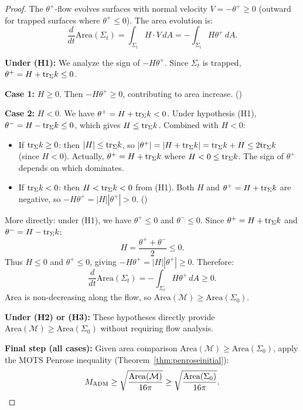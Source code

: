 \begin{proof}
The $\theta^+$-flow evolves surfaces with normal velocity $V = -\theta^+ \geq 0$ (outward for trapped surfaces where $\theta^+ \leq 0$). The area evolution is:
\begin{equation}
\frac{d}{dt}\mathrm{Area}(\Sigma_t) = \int_{\Sigma_t} H \cdot V \, dA = -\int_{\Sigma_t} H \theta^+ \, dA.
\label{eq:area-evol-theta}
\end{equation}

\textbf{Under (H1):} We analyze the sign of $-H\theta^+$. Since $\Sigma_t$ is trapped, $\theta^+ = H + \mathrm{tr}_\Sigma k \leq 0$.

\textbf{Case 1:} $H \geq 0$. Then $-H\theta^+ \geq 0$, contributing to area increase. (\checkmark)

\textbf{Case 2:} $H < 0$. We have $\theta^+ = H + \mathrm{tr}_\Sigma k < 0$. Under hypothesis (H1), $\theta^- = H - \mathrm{tr}_\Sigma k \leq 0$, which gives $H \leq \mathrm{tr}_\Sigma k$. Combined with $H < 0$:
\begin{itemize}
\item If $\mathrm{tr}_\Sigma k \geq 0$: then $|H| \leq \mathrm{tr}_\Sigma k$, so $|\theta^+| = |H + \mathrm{tr}_\Sigma k| = \mathrm{tr}_\Sigma k + H \leq 2\mathrm{tr}_\Sigma k$ (since $H < 0$). Actually, $\theta^+ = H + \mathrm{tr}_\Sigma k$ where $H < 0 \leq \mathrm{tr}_\Sigma k$. The sign of $\theta^+$ depends on which dominates.
\item If $\mathrm{tr}_\Sigma k < 0$: then $H < \mathrm{tr}_\Sigma k < 0$ from (H1). Both $H$ and $\theta^+ = H + \mathrm{tr}_\Sigma k$ are negative, so $-H\theta^+ = |H||\theta^+| > 0$. (\checkmark)
\end{itemize}

More directly: under (H1), we have $\theta^+ \leq 0$ and $\theta^- \leq 0$. Since $\theta^+ = H + \mathrm{tr}_\Sigma k$ and $\theta^- = H - \mathrm{tr}_\Sigma k$:
\begin{equation}
H = \frac{\theta^+ + \theta^-}{2} \leq 0.
\end{equation}
Thus $H \leq 0$ and $\theta^+ \leq 0$, giving $-H\theta^+ = |H||\theta^+| \geq 0$. Therefore:
\begin{equation}
\frac{d}{dt}\mathrm{Area}(\Sigma_t) = -\int_{\Sigma_t} H\theta^+ \, dA \geq 0.
\end{equation}
Area is non-decreasing along the flow, so $\mathrm{Area}(\mathcal{M}) \geq \mathrm{Area}(\Sigma_0)$.

\textbf{Under (H2) or (H3):} These hypotheses directly provide $\mathrm{Area}(\mathcal{M}) \geq \mathrm{Area}(\Sigma_0)$ without requiring flow analysis.

\textbf{Final step (all cases):} Given area comparison $\mathrm{Area}(\mathcal{M}) \geq \mathrm{Area}(\Sigma_0)$, apply the MOTS Penrose inequality (Theorem~\ref{thm:penroseinitial}):
\begin{equation}
M_{\mathrm{ADM}} \geq \sqrt{\frac{\mathrm{Area}(\mathcal{M})}{16\pi}} \geq \sqrt{\frac{\mathrm{Area}(\Sigma_0)}{16\pi}}. \qedhere
\end{equation}
\end{proof}

